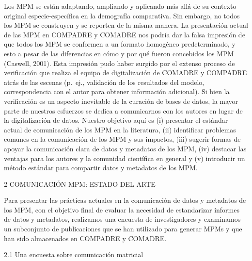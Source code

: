 \documentclass[
  12pt,
  letterpaper,
]{book}
\begin{document}
Los MPM se están adaptando, ampliando y aplicando más allá de su
contexto original especie-específica en la demografía comparativa. Sin
embargo, no todos los MPM se construyen y se reporten de la misma
manera. La presentación actual de las MPM en COMPADRE y COMADRE nos
podría dar la falsa impresión de que todos los MPM se conformen a un
formato homogéneo predeterminado, y esto a pesar de las diferencias en
cómo y por qué fueron concebidos los MPM (Caswell, 2001). Esta impresión
pudo haber surgido por el extenso proceso de verificación que realiza el
equipo de digitalización de COMADRE y COMPADRE atrás de las escenas
(p.~ej., validación de los resultados del modelo, correspondencia con el
autor para obtener información adicional). Si bien la verificación es un
aspecto inevitable de la curación de bases de datos, la mayor parte de
nuestros esfuerzos se dedica a comunicarnos con los autores en lugar de
la digitalización de datos. Nuestro objetivo aquí es (i) presentar el
estándar actual de comunicación de los MPM en la literatura, (ii)
identificar problemas comunes en la comunicación de los MPM y sus
impactos, (iii) sugerir formas de apoyar la comunicación clara de datos
y metadatos de los MPM, (iv) destacar las ventajas para los autores y la
comunidad científica en general y (v) introducir un método estándar para
compartir datos y metadatos de los MPM.

2 \textbar{} COMUNICACIÓN MPM: ESTADO DEL ARTE

Para presentar las prácticas actuales en la comunicación de datos y
metadatos de los MPM, con el objetivo final de evaluar la necesidad de
estandarizar informes de datos y metadatos, realizamos una encuesta de
investigadores y examinamos un subconjunto de publicaciones que se han
utilizado para generar MPMs y que han sido almacenados en COMPADRE y
COMADRE.

2.1 \textbar{} Una encuesta sobre comunicación matricial
\end{document}
